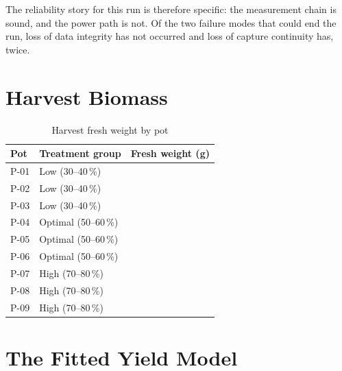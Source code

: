 The reliability story for this run is therefore specific: the measurement
chain is sound, and the power path is not. Of the two failure modes that could
end the run, loss of data integrity has not occurred and loss of capture
continuity has, twice.

\section{Harvest Biomass}


\begin{table}[ht]
\centering
\caption{Harvest fresh weight by pot}
\label{tab:harvest}
\begin{tabular}{llr}
\toprule
\textbf{Pot} & \textbf{Treatment group} & \textbf{Fresh weight (g)} \\
\midrule
P-01 & Low (30--40\,\%)     & \\
P-02 & Low (30--40\,\%)     & \\
P-03 & Low (30--40\,\%)     & \\
P-04 & Optimal (50--60\,\%) & \\
P-05 & Optimal (50--60\,\%) & \\
P-06 & Optimal (50--60\,\%) & \\
P-07 & High (70--80\,\%)    & \\
P-08 & High (70--80\,\%)    & \\
P-09 & High (70--80\,\%)    & \\
\bottomrule
\end{tabular}
\end{table}

\section{The Fitted Yield Model}


